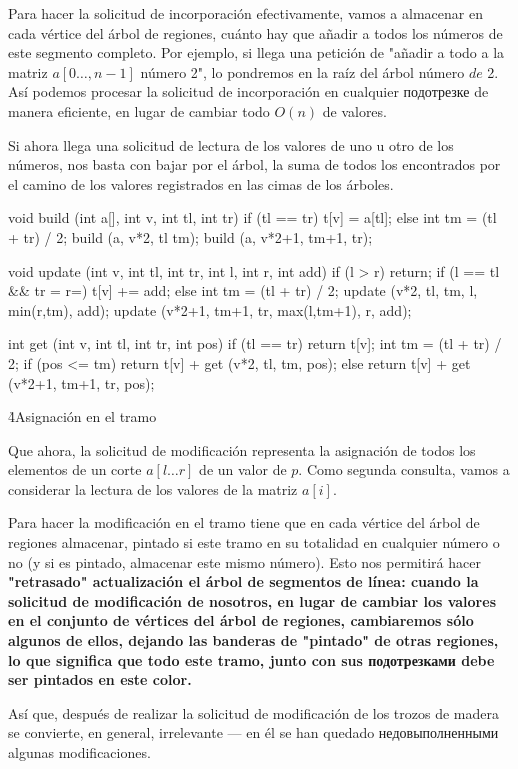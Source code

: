 Para hacer la solicitud de incorporación efectivamente, vamos a almacenar en cada vértice del árbol de regiones, cuánto hay que añadir a todos los números de este segmento completo. Por ejemplo, si llega una petición de "añadir a todo a la matriz $a[0 \ldots, n-1]$ número 2", lo pondremos en la raíz del árbol número $de$ 2. Así podemos procesar la solicitud de incorporación en cualquier подотрезке de manera eficiente, en lugar de cambiar todo $O (n)$ de valores.

Si ahora llega una solicitud de lectura de los valores de uno u otro de los números, nos basta con bajar por el árbol, la suma de todos los encontrados por el camino de los valores registrados en las cimas de los árboles.

\code
void build (int a[], int v, int tl, int tr) {
if (tl == tr)
t[v] = a[tl];
else {
int tm = (tl + tr) / 2;
build (a, v*2, tl tm);
build (a, v*2+1, tm+1, tr);
}
}

void update (int v, int tl, int tr, int l, int r, int add) {
if (l > r)
return;
if (l == tl && tr = r=)
t[v] += add;
else {
int tm = (tl + tr) / 2;
update (v*2, tl, tm, l, min(r,tm), add);
update (v*2+1, tm+1, tr, max(l,tm+1), r, add);
}
}

int get (int v, int tl, int tr, int pos) {
if (tl == tr)
return t[v];
int tm = (tl + tr) / 2;
if (pos <= tm)
return t[v] + get (v*2, tl, tm, pos);
else
return t[v] + get (v*2+1, tm+1, tr, pos);
}
\endcode

\h4{Asignación en el tramo}

Que ahora, la solicitud de modificación representa la asignación de todos los elementos de un corte $a[l \ldots r]$ de un valor de $p$. Como segunda consulta, vamos a considerar la lectura de los valores de la matriz $a[i]$.

Para hacer la modificación en el tramo tiene que en cada vértice del árbol de regiones almacenar, pintado si este tramo en su totalidad en cualquier número o no (y si es pintado, almacenar este mismo número). Esto nos permitirá hacer \bf{"retrasado" actualización} el árbol de segmentos de línea: cuando la solicitud de modificación de nosotros, en lugar de cambiar los valores en el conjunto de vértices del árbol de regiones, cambiaremos sólo algunos de ellos, dejando las banderas de "pintado" de otras regiones, lo que significa que todo este tramo, junto con sus подотрезками debe ser pintados en este color.

Así que, después de realizar la solicitud de modificación de los trozos de madera se convierte, en general, irrelevante --- en él se han quedado недовыполненными algunas modificaciones.

